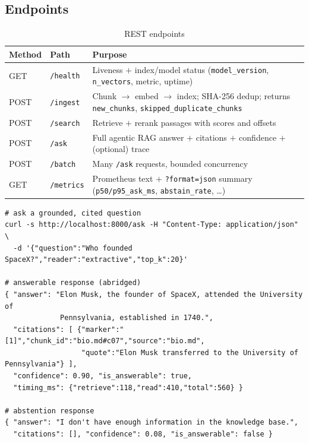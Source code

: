 \documentclass[12pt,a4paper]{article}
\begin{document}
\subsection{Endpoints}

\begin{table}[H]
\centering
\caption{REST endpoints}
\small
\begin{tabularx}{\linewidth}{@{} l l L @{}}
\toprule
\textbf{Method} & \textbf{Path} & \textbf{Purpose} \\
\midrule
GET  & \texttt{/health}  & Liveness $+$ index/model status (\texttt{model\_version}, \texttt{n\_vectors}, metric, uptime) \\
POST & \texttt{/ingest}  & Chunk $\rightarrow$ embed $\rightarrow$ index; SHA-256 dedup; returns \texttt{new\_chunks}, \texttt{skipped\_duplicate\_chunks} \\
POST & \texttt{/search}  & Retrieve $+$ rerank passages with scores and offsets \\
POST & \texttt{/ask}     & Full agentic RAG answer $+$ citations $+$ confidence $+$ (optional) trace \\
POST & \texttt{/batch}   & Many \texttt{/ask} requests, bounded concurrency \\
GET  & \texttt{/metrics} & Prometheus text $+$ \texttt{?format=json} summary (\texttt{p50/p95\_ask\_ms}, \texttt{abstain\_rate}, \dots) \\
\bottomrule
\end{tabularx}
\end{table}

\begin{lstlisting}[basicstyle=\ttfamily\footnotesize]
# ask a grounded, cited question
curl -s http://localhost:8000/ask -H "Content-Type: application/json" \
  -d '{"question":"Who founded SpaceX?","reader":"extractive","top_k":20}'

# answerable response (abridged)
{ "answer": "Elon Musk, the founder of SpaceX, attended the University of
             Pennsylvania, established in 1740.",
  "citations": [ {"marker":"[1]","chunk_id":"bio.md#c07","source":"bio.md",
                  "quote":"Elon Musk transferred to the University of Pennsylvania"} ],
  "confidence": 0.90, "is_answerable": true,
  "timing_ms": {"retrieve":118,"read":410,"total":560} }

# abstention response
{ "answer": "I don't have enough information in the knowledge base.",
  "citations": [], "confidence": 0.08, "is_answerable": false }
\end{lstlisting}
\end{document}
